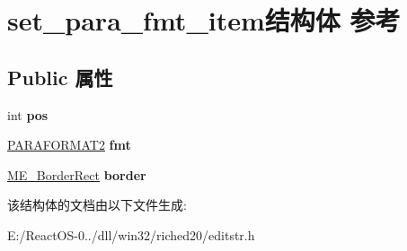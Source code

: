 \hypertarget{structset__para__fmt__item}{}\section{set\+\_\+para\+\_\+fmt\+\_\+item结构体 参考}
\label{structset__para__fmt__item}
\subsection*{Public 属性}
\begin{DoxyCompactItemize}
\item 
\mbox{\label{structset__para__fmt__item_a83ac7dd8f56dfe85cd3b124b544f17f1}} 
int {\bfseries pos}
\item 
\mbox{\label{structset__para__fmt__item_a5ebf2c65dbe127f61ac2174387a830fb}} 
\hyperlink{struct__paraformat2}{P\+A\+R\+A\+F\+O\+R\+M\+A\+T2} {\bfseries fmt}
\item 
\mbox{\label{structset__para__fmt__item_a21955c18dab919ca6939701ef3655ae7}} 
\hyperlink{structtag_m_e___border_rect}{M\+E\+\_\+\+Border\+Rect} {\bfseries border}
\end{DoxyCompactItemize}


该结构体的文档由以下文件生成\+:\begin{DoxyCompactItemize}
\item 
E\+:/\+React\+O\+S-\/0../dll/win32/riched20/editstr.\+h\end{DoxyCompactItemize}
